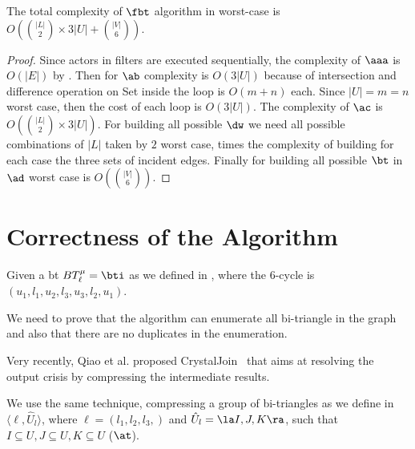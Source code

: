 \begin{proposition}
The total complexity of $\fbt$ algorithm in worst-case is $O(\binom{|L|}{2} \times 3|U| + \binom{|V|}{6})$.
\end{proposition}
\begin{proof}
Since actors in filters are executed sequentially, the complexity of $\aaa$ is $O(|E|)$ by .
Then for $\ab$ complexity is $O(3|U|)$ because of intersection and difference operation on Set inside the loop is $O(m+n)$ each. 
Since $|U| = m = n$ worst case, then the cost of each loop is $O(3|U|)$.  
The complexity of $\ac$ is $O(\binom{|L|}{2} \times 3|U|)$. For building all possible $\dw$ we need all possible combinations of $|L|$ taken by $2$ worst case, times the complexity of building for each case the three sets of incident edges.
Finally for building all possible $\bt$ in $\ad$ worst case is $O(\binom{|V|}{6})$.
\end{proof}
      
      
\clearpage
\section{Correctness of the Algorithm}
Given a \acrshort{bt} $BT_{\ell}^{\mu} = \bti$ as we defined in , where the 6-cycle is $(u_1,l_1,u_2,l_3,u_3,l_2,u_1)$.


We need to prove that the algorithm can enumerate all bi-triangle in the graph and also that there are no duplicates in the enumeration.

Very recently, Qiao et al. proposed CrystalJoin~\cite{Lai} that aims at resolving the output crisis by compressing the intermediate results.

We use the same technique, compressing a group of bi-triangles as we define in  $\langle \ell, \hat{U}_l\rangle$, where $\ell = (l_1,l_2,l_3,)$ and $\hat{U}_l= \la I, J, K\ra$, such that $I \subseteq U, J \subseteq U, K \subseteq U$ ($\at$).
 

